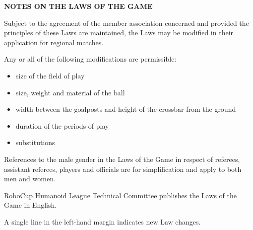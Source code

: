 \clearpage
\sffamily
{\bfseries\color[rgb]{0.4,0.4,0.4}
NOTES ON THE LAWS OF THE GAME }

\bigskip

{\color[rgb]{0.4,0.4,0.4}{Modifications} }

Subject to the agreement of the member association concerned and provided the principles of these Laws are maintained, the Laws may be modified in their application for regional matches.

Any or all of the following modifications are permissible: 

\begin{itemize}
\item size of the field of play
\item size, weight and material of the ball
\item width between the goalposts and height of the crossbar from the ground
\item duration of the periods of play
\item substitutions
\end{itemize}

\bigskip

{\color[rgb]{0.4,0.4,0.4}{Male and Female}}

References to the male gender in the Laws of the Game in respect of referees, assistant referees, players and officials are for simplification and apply to both men and women.

\bigskip

{\color[rgb]{0.4,0.4,0.4}{Official languages}}

RoboCup Humanoid League Technical Committee publishes the Laws of the Game in English.

\bigskip

{\color[rgb]{0.4,0.4,0.4}{Key} }

A single line in the left-hand margin indicates new Law changes.